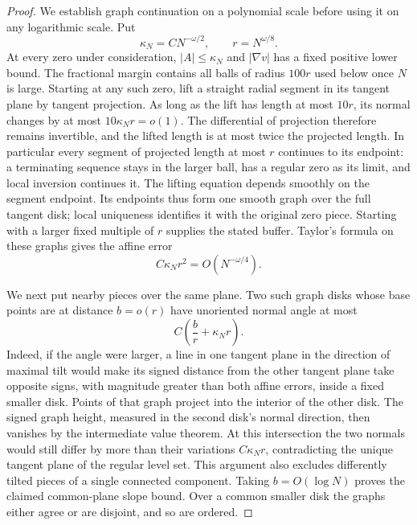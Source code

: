 \begin{proof}
We establish graph continuation on a polynomial scale before using it
on any logarithmic scale.  Put
\[
 \kappa_N=CN^{-\omega/2},\qquad r=N^{\omega/8}.
\]
At every zero under consideration, $|A|\le\kappa_N$ and
$|\nabla v|$ has a fixed positive lower bound.  The fractional margin
contains all balls of radius $100r$ used below once $N$ is large.
Starting at any such zero, lift a straight radial segment in its
tangent plane by tangent projection.  As long as the lift has length
at most $10r$, its normal changes by at most $10\kappa_Nr=o(1)$.
The differential of projection therefore remains invertible, and
the lifted length is at most twice the projected length.  In
particular every segment of projected length at most $r$ continues
to its endpoint: a terminating sequence stays in the larger ball,
has a regular zero as its limit, and local inversion continues it.
The lifting equation depends smoothly on the segment endpoint.
Its endpoints thus form one smooth graph over the full tangent disk;
local uniqueness identifies it with the original zero piece.
Starting with a larger fixed multiple of $r$ supplies the stated
buffer.  Taylor's formula on these graphs gives the affine error
\[
 C\kappa_Nr^2=O(N^{-\omega/4}).
\]

We next put nearby pieces over the same plane.  Two such graph disks
whose base points are at distance $b=o(r)$ have unoriented normal
angle at most
\begin{equation}\label{eq:interface-clean-angle}
 C\left(\frac b r+\kappa_Nr\right).
\end{equation}
Indeed, if the angle were larger, a line in one tangent plane in the
direction of maximal tilt would make its signed distance from the
other tangent plane take opposite signs, with magnitude greater
than both affine errors, inside a fixed smaller disk.  Points of
that graph project into the interior of the other disk.  The signed
graph height, measured in the second disk's normal direction, then
vanishes by the intermediate value theorem.  At this intersection
the two normals would still differ by more than their variations
$C\kappa_Nr$, contradicting the unique tangent plane of the regular
level set.  This argument also excludes differently tilted pieces
of a single connected component.  Taking $b=O(\log N)$ proves the
claimed common-plane slope bound.  Over a common smaller disk the
graphs either agree or are disjoint, and so are ordered.


\end{proof}
